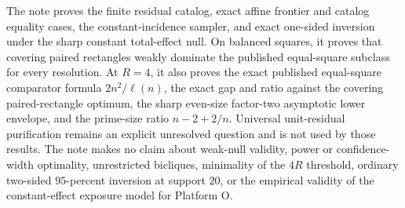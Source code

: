\documentclass{article}
\begin{document}
The note proves the finite residual catalog, exact affine frontier and catalog equality cases, the constant-incidence sampler, and exact one-sided inversion under the sharp constant total-effect null. On balanced squares, it proves that covering paired rectangles weakly dominate the published equal-square subclass for every resolution. At \(R=4\), it also proves the exact published equal-square comparator formula \(2n^2/\ell(n)\), the exact gap and ratio against the covering paired-rectangle optimum, the sharp even-size factor-two asymptotic lower envelope, and the prime-size ratio \(n-2+2/n\). Universal unit-residual purification remains an explicit unresolved question and is not used by those results. The note makes no claim about weak-null validity, power or confidence-width optimality, unrestricted bicliques, minimality of the \(4R\) threshold, ordinary two-sided \(95\)-percent inversion at support \(20\), or the empirical validity of the constant-effect exposure model for Platform O.
\end{document}
